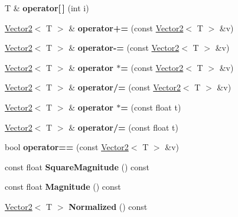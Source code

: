 \begin{DoxyCompactItemize}
T \& {\bfseries operator\mbox{[}$\,$\mbox{]}} (int i)
\item 
\mbox{\label{class_vector2_a5c004e8ca8365c0a2c266654f234023e}} 
\mbox{\hyperlink{class_vector2}{Vector2}}$<$ T $>$ \& {\bfseries operator+=} (const \mbox{\hyperlink{class_vector2}{Vector2}}$<$ T $>$ \&v)
\item 
\mbox{\label{class_vector2_a10ab47df2c0304ac442265f5d5d0b8a2}} 
\mbox{\hyperlink{class_vector2}{Vector2}}$<$ T $>$ \& {\bfseries operator-\/=} (const \mbox{\hyperlink{class_vector2}{Vector2}}$<$ T $>$ \&v)
\item 
\mbox{\label{class_vector2_add0d91131112ba9d4e1452013256817e}} 
\mbox{\hyperlink{class_vector2}{Vector2}}$<$ T $>$ \& {\bfseries operator $\ast$=} (const \mbox{\hyperlink{class_vector2}{Vector2}}$<$ T $>$ \&v)
\item 
\mbox{\label{class_vector2_a8da1d4fcb3f6f66d391f959f030b52ec}} 
\mbox{\hyperlink{class_vector2}{Vector2}}$<$ T $>$ \& {\bfseries operator/=} (const \mbox{\hyperlink{class_vector2}{Vector2}}$<$ T $>$ \&v)
\item 
\mbox{\label{class_vector2_a618ee485733a700674b4f7942e7c1318}} 
\mbox{\hyperlink{class_vector2}{Vector2}}$<$ T $>$ \& {\bfseries operator $\ast$=} (const float t)
\item 
\mbox{\label{class_vector2_aaf8f57a88c6a6c08fc4d2cae35a24c27}} 
\mbox{\hyperlink{class_vector2}{Vector2}}$<$ T $>$ \& {\bfseries operator/=} (const float t)
\item 
\mbox{\label{class_vector2_a90ace29e191da2edd698fe157c97c1cb}} 
bool {\bfseries operator==} (const \mbox{\hyperlink{class_vector2}{Vector2}}$<$ T $>$ \&v)
\item 
\mbox{\label{class_vector2_a42ae3a0c436c08a823b18435e61a9224}} 
const float {\bfseries Square\+Magnitude} () const
\item 
\mbox{\label{class_vector2_a7e109d2fc7e3ae6ae344b7a625c04059}} 
const float {\bfseries Magnitude} () const
\item 
\mbox{\label{class_vector2_a75a0443354160442b91ae76f8a1cb6d2}} 
\mbox{\hyperlink{class_vector2}{Vector2}}$<$ T $>$ {\bfseries Normalized} () const
\end{DoxyCompactItemize}
